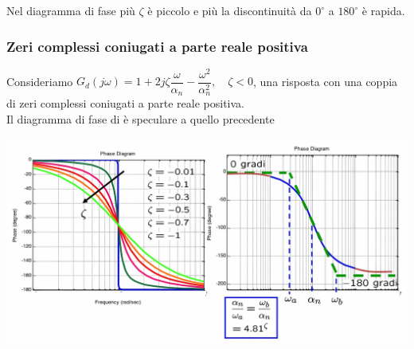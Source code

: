 \documentclass{article}
\numberwithin{equation}{subsection}
\begin{document}
Nel diagramma di fase più $\zeta$ è piccolo e più la discontinuità da $0^\circ$ a $180^\circ$ è rapida. 



\subsubsection{Zeri complessi coniugati a parte reale positiva}
Consideriamo $G_d(j\omega) = 1+ 2j \zeta \dfrac{\omega}{\alpha_n} - \dfrac{\omega^2}{\alpha_n^2}, \quad \zeta < 0$, una risposta con una coppia di zeri complessi coniugati a parte reale positiva.\\
Il diagramma di fase di è speculare a quello precedente
\begin{center}
    \includegraphics[scale=0.15]{Images/Diagramma_zeri_cc_pos_1.png}
\end{center}
\end{document}
